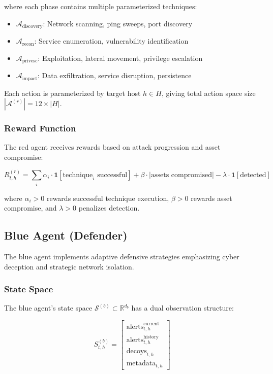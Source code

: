 \documentclass[11pt]{article}
\newcounter{phase}[algorithm]
\theoremstyle{definition}
\theoremstyle{plain}
\newcommand{\MC}[1]{\mathcal{#1}}
\begin{document}
where each phase contains multiple parameterized techniques:
\begin{itemize}
    \item $\MC{A}_{\text{discovery}}$: Network scanning, ping sweeps, port discovery
    \item $\MC{A}_{\text{recon}}$: Service enumeration, vulnerability identification
    \item $\MC{A}_{\text{privesc}}$: Exploitation, lateral movement, privilege escalation
    \item $\MC{A}_{\text{impact}}$: Data exfiltration, service disruption, persistence
\end{itemize}

Each action is parameterized by target host $h \in H$, giving total action space size $|\MC{A}^{(r)}| = 12 \times |H|$.

\subsubsection{Reward Function}
The red agent receives rewards based on attack progression and asset compromise:

\begin{equation}
R_{t,h}^{(r)} = \sum_{i} \alpha_i \cdot \mathbf{1}[\text{technique}_i \text{ successful}] + \beta \cdot |\text{assets compromised}| - \lambda \cdot \mathbf{1}[\text{detected}]
\end{equation}

where $\alpha_i > 0$ rewards successful technique execution, $\beta > 0$ rewards asset compromise, and $\lambda > 0$ penalizes detection.

\subsection{Blue Agent (Defender)}

The blue agent implements adaptive defensive strategies emphasizing cyber deception and strategic network isolation.

\subsubsection{State Space}
The blue agent's state space $\MC{S}^{(b)} \subset \mathbb{R}^{d_b}$ has a dual observation structure:

\begin{equation}
S_{t,h}^{(b)} = \begin{bmatrix}
\text{alerts}_{t,h}^{\text{current}} \\
\text{alerts}_{t,h}^{\text{history}} \\
\text{decoys}_{t,h} \\
\text{metadata}_{t,h}
\end{bmatrix}
\end{equation}
\end{document}
